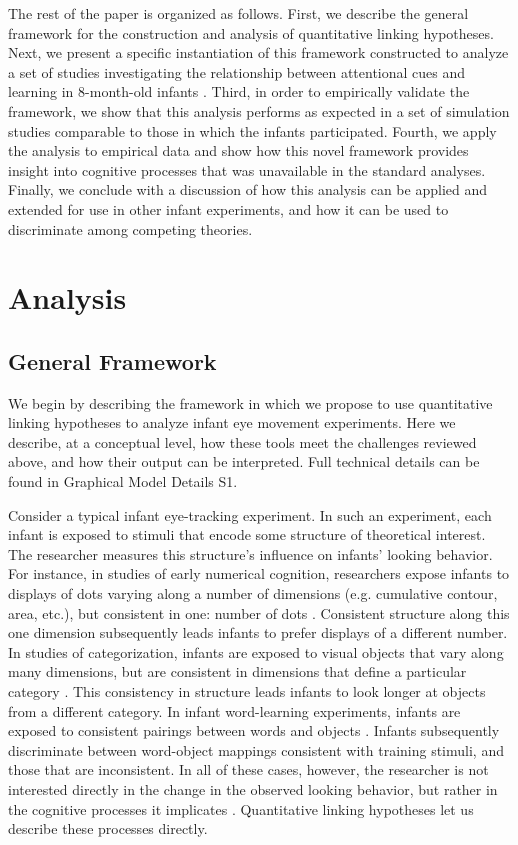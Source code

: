 \documentclass[12pt]{article}
\begin{document}
	The rest of the paper is organized as follows. First, we describe the general framework for the construction and analysis of quantitative linking hypotheses. Next, we present a specific instantiation of this framework constructed to analyze a set of studies investigating the relationship between attentional cues and learning in 8-month-old infants \cite{Wu2010a}. Third, in order to empirically validate the framework, we show that this analysis performs as expected in a set of simulation studies comparable to those in which the infants participated. Fourth, we apply the analysis to empirical data and show how this novel framework provides insight into cognitive processes that was unavailable in the standard analyses. Finally, we conclude with a discussion of how this analysis can be applied and extended for use in other infant experiments, and how it can be used to discriminate among competing theories.

\section*{Analysis}

\subsection*{General Framework}

We begin by describing the framework in which we propose to use quantitative linking hypotheses to analyze infant eye movement experiments. Here we describe, at a conceptual level, how these tools meet the challenges reviewed above, and how their output can be interpreted. Full technical details can be found in Graphical Model Details S1.

	Consider a typical infant eye-tracking experiment. In such an experiment, each infant is exposed to stimuli that encode some structure of theoretical interest. The researcher measures this structure's influence on infants' looking behavior. For instance, in studies of early numerical cognition, researchers expose infants to displays of dots varying along a number of dimensions (e.g. cumulative contour, area, etc.), but consistent in one: number of dots \cite{Xu2000, Brannon2003}. Consistent structure along this one dimension subsequently leads infants to prefer displays of a different number. In studies of categorization, infants are exposed to visual objects that vary along many dimensions, but are consistent in dimensions that define a particular category \cite{Younger1986, Waxman1995}. This consistency in structure leads infants to look longer at objects from a different category. In infant word-learning experiments, infants are exposed to consistent pairings between words and objects \cite{Werker1998, Smith2008}. Infants subsequently discriminate between word-object mappings consistent with training stimuli, and those that are inconsistent. In all of these cases, however, the researcher is not interested directly in the change in the observed looking behavior, but rather in the cognitive processes it implicates \cite{Lashley1951, Miller2003}. Quantitative linking hypotheses let us describe these processes directly.
\end{document}
